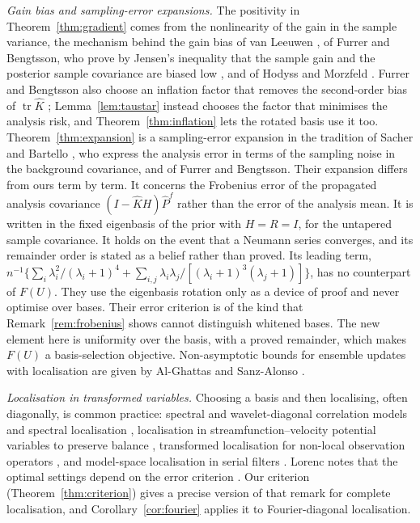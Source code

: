 \documentclass[11pt,a4paper]{article}
\numberwithin{equation}{section}
\theoremstyle{remark}\newtheorem{remark}[theorem]{Remark}
\newcommand{\tr}{\operatorname{tr}}
\begin{document}
\emph{Gain bias and sampling-error expansions.} The positivity in
Theorem~\ref{thm:gradient} comes from the nonlinearity of the gain in the sample variance,
the mechanism behind the gain bias of van Leeuwen \cite{vanLeeuwen1999}, of Furrer and
Bengtsson, who prove by Jensen's inequality that the sample gain and the posterior sample
covariance are biased low \cite[Section~2.3, Eq.~(6) and Corollaries~2--3]{FurrerBengtsson2007},
and of Hodyss and Morzfeld \cite{HodyssMorzfeld2023}. Furrer and Bengtsson also choose an
inflation factor that removes the second-order bias of \(\tr\hat K\)
\cite[Section~5, Eq.~(26)]{FurrerBengtsson2007}; Lemma~\ref{lem:taustar} instead chooses the
factor that minimises the analysis risk, and Theorem~\ref{thm:inflation} lets the rotated
basis use it too. Theorem~\ref{thm:expansion} is a sampling-error expansion in the tradition of
Sacher and Bartello \cite{SacherBartello2008}, who express the analysis error in terms of the
sampling noise in the background covariance, and of Furrer and Bengtsson. Their expansion
\cite[Proposition~6, Eqs.~(14)--(15) and Lemma~9]{FurrerBengtsson2007} differs from ours term by
term. It concerns the Frobenius error of the propagated analysis covariance
\((I-\hat KH)\hat P^f\) rather than the error of the analysis mean. It is written in the fixed
eigenbasis of the prior with \(H=R=I\), for the untapered sample covariance. It holds on the event
that a Neumann series converges, and its remainder order is stated as a belief rather than
proved. Its leading term,
\(n^{-1}\{\sum_i\lambda_i^2/(\lambda_i+1)^4+\sum_{i,j}\lambda_i\lambda_j/[(\lambda_i+1)^3(\lambda_j+1)]\}\),
has no counterpart of \(F(U)\). They use the eigenbasis rotation only as a device of proof and
never optimise over bases. Their error criterion is of the kind that
Remark~\ref{rem:frobenius} shows cannot distinguish whitened bases. The new element here is
uniformity over the basis, with a proved remainder, which makes \(F(U)\) a basis-selection
objective. Non-asymptotic bounds for ensemble updates with localisation are
given by Al-Ghattas and Sanz-Alonso \cite{AlGhattas2024}.

\emph{Localisation in transformed variables.} Choosing a basis and then localising, often
diagonally, is common practice: spectral and wavelet-diagonal correlation models and
spectral localisation \cite{BuehnerCharron2007,Lorenc2017}, localisation in
streamfunction--velocity potential variables to preserve balance \cite{Kepert2009},
transformed localisation for non-local observation operators \cite{NadeemPotthast2016}, and
model-space localisation in serial filters \cite{Shlyaeva2019}. Lorenc notes that the
optimal settings depend on the error criterion \cite{Lorenc2017}. Our criterion
(Theorem~\ref{thm:criterion}) gives a precise version of that remark for complete
localisation, and Corollary~\ref{cor:fourier} applies it to Fourier-diagonal localisation.
\end{document}
